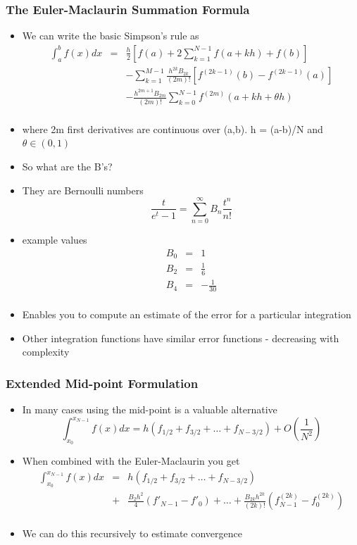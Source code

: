 \documentclass[10pt]{beamer}
\begin{document}
\begin{frame}
  \frametitle{The Euler-Maclaurin Summation Formula}
  \begin{itemize}
  \item We can write the basic Simpson's rule as
    \[
      \begin{array}{rcl}
      \int_a^b f(x) dx &=& \frac{h}{2} \left[ f(a) + 2 \sum_{k=1}^{N-1} f (a + kh) + f(b) \right]\\
                       && - \sum_{k=1}^{M-1} \frac{h^{2k} B_{2k}}{(2m)!}[ f^{(2k-1)}(b) - f^{(2k-1)}(a)] \\
                       && - \frac{h^{2m+1} B_{2m}}{(2m)!}\sum_{k=0}^{N-1} f^{(2m)}(a + kh + \theta h)\\
      \end{array}
    \]
  \item where 2m first derivatives are continuous over (a,b). h = (a-b)/N and $\theta\in(0,1)$
  \item So what are the B's?
  \item They are Bernoulli numbers
    \[
      \frac{t}{e^t-1} = \sum_{n=0}^{\infty} B_n \frac{t^n}{n!}
    \]
  \item example values
    \[
      \begin{array}{rcl}
        B_0 & = & 1\\
        B_2 & = & \frac{1}{6} \\
        B_4 & = & - \frac{1}{30}\\
      \end{array}
    \]
  \item Enables you to compute an estimate of the error for a particular integration
  \item Other integration functions have similar error functions - decreasing with complexity
  \end{itemize}
\end{frame}

\begin{frame}
  \frametitle{Extended Mid-point Formulation}
  \begin{itemize}
  \item In many cases using the mid-point is a valuable alternative
    \[
      \int_{x_0}^{x_{N-1}} f(x) dx = h (f_{1/2} + f_{3/2} + \ldots + f_{N-3/2}) + O(\frac{1}{N^2})
    \]
  \item When combined with the Euler-Maclaurin you get
    \[
      \begin{array}{rcl}
        \int_{x_0}^{x_{N-1}} f(x) dx &=& h (f_{1/2} + f_{3/2} + \ldots + f_{N-3/2}) \\
                & + & \frac{B_2 h^2}{4} (f'_{N-1} - f'_0) + \ldots + \frac{B_{2k} h^{2k}}{(2k)!} (f^{(2k)}_{N-1} - f^{(2k)}_0) \\
      \end{array}
    \]
  \item We can do this recursively to estimate convergence
  \end{itemize}
\end{frame}
\end{document}
